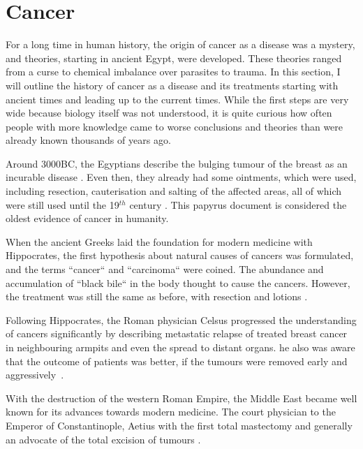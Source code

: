 \section{Cancer}
\label{intro-sec:cancer}

For a long time in human history, the origin of cancer as a disease was a mystery, and  theories, starting in ancient Egypt, were developed. These theories ranged from a curse to chemical imbalance over parasites to trauma. In this section, I will outline the history of cancer as a disease and its treatments starting with ancient times and leading up to the current times. While the first steps are very wide because  biology itself was not understood, it is quite curious how often people with more knowledge came to worse conclusions and theories than were already known thousands of years ago.

Around 3000BC, the Egyptians describe the bulging tumour of the breast as an incurable disease \cite{Breasted1930}. Even then, they already had some ointments, which were used, including resection, cauterisation and salting of the affected areas, all of which were still used  until the 19$^{th}$ century \cite{Hajdu2004}. This papyrus document is considered the oldest evidence of cancer in humanity.

When the ancient Greeks laid the foundation for modern medicine with Hippocrates, the first hypothesis about natural causes of cancers was formulated, and the terms ``cancer`` and ``carcinoma`` were coined. The abundance and accumulation of ``black bile`` in the body  thought to  cause  the cancers. However, the treatment was still the same as before, with resection and lotions \cite{Chadwick1950}.

Following Hippocrates, the Roman physician Celsus progressed the understanding of cancers significantly by describing metastatic relapse of treated breast cancer in neighbouring armpits and even the spread to distant organs.  he also was aware that the outcome of patients was better, if the tumours were removed early and aggressively~\cite{Celsus1939}.

With the destruction of the western Roman Empire, the Middle East became well known for its  advances towards modern medicine. The court physician to the Emperor of Constantinople, Aetius  with the first total mastectomy and  generally  an advocate of the total excision of tumours \cite{Browne2012}. 

